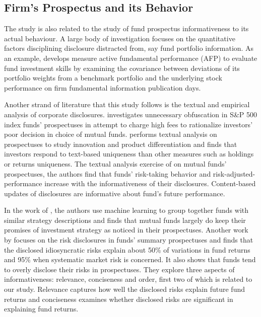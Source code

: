 \documentclass[12pt]{article} %
\begin{document}
\subsection{Firm's Prospectus and its Behavior}
	The study is also related to the study of fund prospectus informativeness to its actual behaviour. A large body of investigation focuses on the quantitative factors disciplining disclosure distracted from, say fund portfolio information. As an example, \cite{JiangZheng2018} develops measure active fundamental performance (AFP) to evaluate fund investment skills by examining the covariance between deviations of its portfolio weights from a benchmark portfolio and the underlying stock performance on firm fundamental information publication days.\par 
	Another strand of literature that this study follows is the textual and empirical analysis of corporate disclosures. \cite{deHaanetal2021} investigates unnecessary obfuscation in S\&P 500 index funds' prospectuses in attempt to charge high fees to rationalize investors' poor decision in choice of mutual funds. \cite{KostovetskyWarner2020} performs textual analysis on prospectuses to study innovation and product differentiation and finds that investors respond to text-based uniqueness than other measures such as holdings or returns uniqueness. The textual analysis exercise of \cite{KrakowSchaefer2020} on mutual funds' prospectuses, the authors find that funds' risk-taking behavior and risk-adjusted-performance increase with the informativeness of their disclosures. Content-based updates of disclosures are informative about fund's future performance.\par
	In the work of \cite{AbisLines2022}, the authors use machine learning to group together funds with similar strategy descriptions and finds that mutual funds largely do keep their promises of investment strategy as noticed in their prospectuses. Another work by \cite{ShengXuZheng2022} focuses on the risk disclosures in funds' summary prospectuses and finds that the disclosed idiosyncratic risks explain about 50\% of variations in fund returns and 95\% when systematic market risk is concerned. It also shows that funds tend to overly disclose their risks in prospectuses. They explore three aspects of informativeness: relevance, conciseness and order, first two of which is related to our study. Relevance captures how well the disclosed risks explain future fund returns and conciseness examines whether disclosed risks are significant in explaining fund returns.
\end{document}
